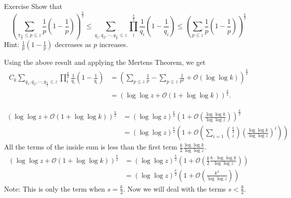 \documentclass{beamer}
\numberwithin{theorem}{section}
\theoremstyle{definition}
\begin{document}
\begin{frame}[shrink=18]
\begin{block}{Exercise}
    Show that 
    $$\left(\sum_{\pi_{\frac{k}{2}}\le p\le z}\frac{1}{p}\left(1-\frac{1}{p}\right)\right)^{\frac{k}{2}}\le \sum_{q_1,q_2,\cdots,q_{\frac{k}{2}}\le z}\prod_{i}^{\frac{k}{2}}\frac{1}{q_i}\left(1-\frac{1}{q_i}\right)\le \left(\sum_{ p\le z}\frac{1}{p}\left(1-\frac{1}{p}\right)\right)^{\frac{k}{2}} $$
    Hint: $\frac{1}{p}\left(1-\frac{1}{p}\right)$ decreases as $p$ increases.
\end{block}
Using the above result and applying the Mertens Theorem, we get
\begin{align*}
C_k\sum_{q_1,q_2,\cdots,q_{\frac{k}{2}}\le z}\prod_{i}^{\frac{k}{2}}\frac{1}{q_i}\left(1-\frac{1}{q_i}\right)&=\left(\sum_{p\le z}\frac{1}{p}-\sum_{p\le z}\frac{1}{p^2}+\mathcal{O}(\log\log k)\right)^{\frac{k}{2}}\\ &=(\log \log z+\mathcal{O}(1+\log\log k))^{\frac{k}{2}}.
\end{align*}

\end{frame}
\begin{frame}[shrink=8]
\begin{align*}
    (\log \log z+\mathcal{O}(1+\log\log k))^{\frac{k}{2}}&=(\log \log z)^{\frac{k}{2}}\left(1+\mathcal{O}\left(\frac{\log \log k}{\log \log z}\right)\right)^{\frac{k}{2}}\\
    &=(\log \log z)^{\frac{k}{2}}\left(1+\mathcal{O}\left(\sum_{i=1}{\frac{k}{2} \choose i}\left(\frac{\log \log k}{\log \log z}\right)^i\right)\right)
\end{align*}
All the terms of the inside sum is less than the first term $\frac{k}{2}\frac{ \log \log k}{\log \log z}$. 
\begin{align*}
    (\log \log z+\mathcal{O}(1+\log\log k))^{\frac{k}{2}}&=(\log \log z)^{\frac{k}{2}}\left(1+\mathcal{O}\left(\frac{k}{2}\frac{k\cdot \log \log k}{\log \log z}\right)\right)\\&= (\log \log z)^{\frac{k}{2}}\left(1+\mathcal{O}\left(\frac{k^3}{\log \log z}\right)\right)
\end{align*}
    Note: This is only the term when $s=\frac{k}{2}$. Now we will deal with the terms $s<\frac{k}{2}$.
\end{frame}
\end{document}
